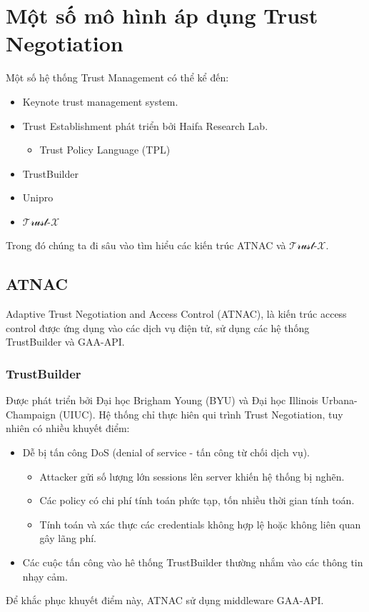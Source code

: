 \documentclass[12pt]{article}
\newcommand{\trustx}{$\mathcal{\text{Trust-}X}$}
\begin{document}
\section{Một số mô hình áp dụng Trust Negotiation}
Một số hệ thống Trust Management có thể kể đến:
\begin{itemize}
\item Keynote trust management system.
\item Trust Establishment phát triển bởi Haifa Research Lab.
\begin{itemize}
\item Trust Policy Language (TPL)\cite{848442}
\end{itemize}
\item TrustBuilder
\item Unipro
\item \trustx
\end{itemize}

Trong đó chúng ta đi sâu vào tìm hiểu các kiến trúc ATNAC và \trustx.

\subsection{ATNAC}
Adaptive Trust Negotiation and Access Control (ATNAC)\cite{10.1145/1063979.1064004}, là kiến trúc access control được ứng dụng vào các dịch vụ điện tử, sử dụng các hệ thống TrustBuilder và GAA-API. 

\subsubsection{TrustBuilder}
Được phát triển bởi Đại học Brigham Young (BYU) và Đại học Illinois Urbana-Champaign (UIUC). Hệ thống chỉ thực hiên qui trình Trust Negotiation, tuy nhiên có nhiều khuyết điểm:
\begin{itemize}
\item Dễ bị tấn công DoS (denial of service - tấn công từ chối dịch vụ).
\begin{itemize}
\item Attacker gửi số lượng lớn sessions lên server khiến hệ thống bị nghẽn.
\item Các policy có chi phí tính toán phức tạp, tốn nhiều thời gian tính toán.
\item Tính toán và xác thực các credentials không hợp lệ hoặc không liên quan gây lãng phí. 
\end{itemize}
\item Các cuộc tấn công vào hê thống TrustBuilder thường nhắm vào các thông tin nhạy cảm.
\end{itemize}
Để khắc phục khuyết điểm này, ATNAC sử dụng middleware GAA-API.
\end{document}
